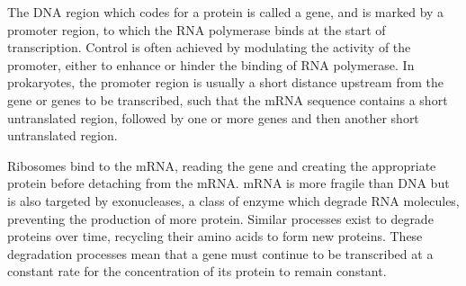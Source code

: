 \documentclass[twoside,a4paper]{article}
\begin{document}
\begin{multicols}{2}
The DNA region which codes for a protein is called a gene, and is marked by a
promoter region, to which the RNA polymerase binds at the start of
transcription.
Control is often achieved by modulating the activity of the promoter, either to
enhance or hinder the binding of RNA polymerase.
In prokaryotes, the promoter region is usually a short distance upstream from
the gene or genes to be transcribed, such that the mRNA sequence contains a
short untranslated region, followed by one or more genes and then another short
untranslated region.

Ribosomes bind to the mRNA, reading the gene and creating the appropriate
protein before detaching from the mRNA.
mRNA is more fragile than DNA but is also targeted by exonucleases, a class of
enzyme which degrade RNA molecules, preventing the production of more protein.
Similar processes exist to degrade proteins over time, recycling their amino
acids to form new proteins.
These degradation processes mean that a gene must continue to be transcribed at
a constant rate for the concentration of its protein to remain constant.


\tiny






\end{multicols}
\end{document}
